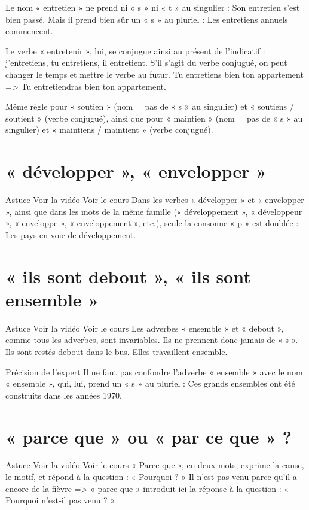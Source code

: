 Le nom « entretien » ne prend ni « s » ni « t » au singulier : Son entretien s'est bien passé.
Mais il prend bien sûr un « s » au pluriel : Les entretiens annuels commencent.

Le verbe « entretenir », lui, se conjugue ainsi au présent de l'indicatif : j'entretiens, tu entretiens, il entretient.
S'il s'agit du verbe conjugué, on peut changer le temps et mettre le verbe au futur.
Tu entretiens bien ton appartement => Tu entretiendras bien ton appartement.

Même règle pour « soutien » (nom = pas de « s » au singulier) et « soutiens / soutient » (verbe conjugué), ainsi que pour « maintien » (nom = pas de « s » au singulier) et « maintiens / maintient » (verbe conjugué).

\section{« développer », « envelopper »}

Astuce Voir la vidéo Voir le cours
Dans les verbes « développer » et « envelopper », ainsi que dans les mots de la même famille (« développement », « développeur », « enveloppe », « enveloppement », etc.), seule la consonne « p » est doublée : Les pays en voie de développement.

\section{« ils sont debout », « ils sont ensemble »}

Astuce Voir la vidéo Voir le cours
Les adverbes « ensemble » et « debout », comme tous les adverbes, sont invariables. Ils ne prennent donc jamais de « s ».
Ils sont restés debout dans le bus.
Elles travaillent ensemble.

Précision de l'expert
Il ne faut pas confondre l'adverbe « ensemble » avec le nom « ensemble », qui, lui, prend un « s » au pluriel : Ces grands ensembles ont été construits dans les années 1970.


\section{« parce que » ou « par ce que » ?}

Astuce Voir la vidéo Voir le cours
« Parce que », en deux mots, exprime la cause, le motif, et répond à la question : « Pourquoi ? »
Il n'est pas venu parce qu'il a encore de la fièvre => « parce que » introduit ici la réponse à la question : « Pourquoi n'est‑il pas venu ? »

